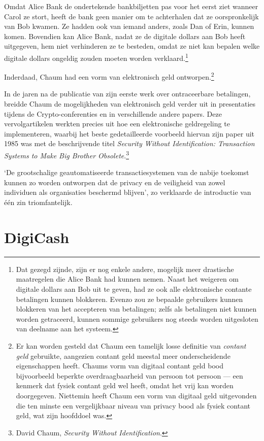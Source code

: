 \documentclass[
  a5paper,
  smalldemyvopaper,11pt,twoside,onecolumn,openright,extrafontsizes,
hidelinks]{memoir}
\begin{document}
Omdat Alice Bank de ondertekende bankbiljetten pas voor het eerst ziet
wanneer Carol ze stort, heeft de bank geen manier om te achterhalen dat
ze oorspronkelijk van Bob kwamen. Ze hadden ook van iemand anders, zoals
Dan of Erin, kunnen komen. Bovendien kan Alice Bank, nadat ze de
digitale dollars aan Bob heeft uitgegeven, hem niet verhinderen ze te
besteden, omdat ze niet kan bepalen welke digitale dollars ongeldig
zouden moeten worden verklaard.\footnote{Dat gezegd zijnde, zijn er nog
  enkele andere, mogelijk meer drastische maatregelen die Alice Bank had
  kunnen nemen. Naast het weigeren om digitale dollars aan Bob uit te
  geven, had ze ook alle elektronische contante betalingen kunnen
  blokkeren. Evenzo zou ze bepaalde gebruikers kunnen blokkeren van het
  accepteren van betalingen; zelfs als betalingen niet kunnen worden
  getraceerd, kunnen sommige gebruikers nog steeds worden uitgesloten
  van deelname aan het systeem.}

Inderdaad, Chaum had een vorm van elektronisch geld
ontworpen.\footnote{Er kan worden gesteld dat Chaum een tamelijk losse
  definitie van \emph{contant geld} gebruikte, aangezien contant geld
  meestal meer onderscheidende eigenschappen heeft. Chaums vorm van
  digitaal contant geld bood bijvoorbeeld beperkte overdraagbaarheid van
  persoon tot persoon --- een kenmerk dat fysiek contant geld wel heeft,
  omdat het vrij kan worden doorgegeven. Niettemin heeft Chaum een vorm
  van digitaal geld uitgevonden die ten minste een vergelijkbaar niveau
  van privacy bood als fysiek contant geld, wat zijn hoofddoel was.}

In de jaren na de publicatie van zijn eerste werk over ontraceerbare
betalingen, breidde Chaum de mogelijkheden van elektronisch geld verder
uit in presentaties tijdens de Crypto-conferenties en in verschillende
andere papers. Deze vervolgartikelen werkten precies uit hoe een
elektronische geldregeling te implementeren, waarbij het beste
gedetailleerde voorbeeld hiervan zijn paper uit 1985 was met de
beschrijvende titel \emph{Security Without Identification: Transaction
Systems to Make Big Brother Obsolete}.\footnote{David Chaum,
  \emph{Security Without Identification}.}

`De grootschalige geautomatiseerde transactiesystemen van de nabije
toekomst kunnen zo worden ontworpen dat de privacy en de veiligheid van
zowel individuen als organisaties beschermd blijven', zo verklaarde de
introductie van één zin triomfantelijk.

\section{DigiCash}\label{digicash}
\end{document}
